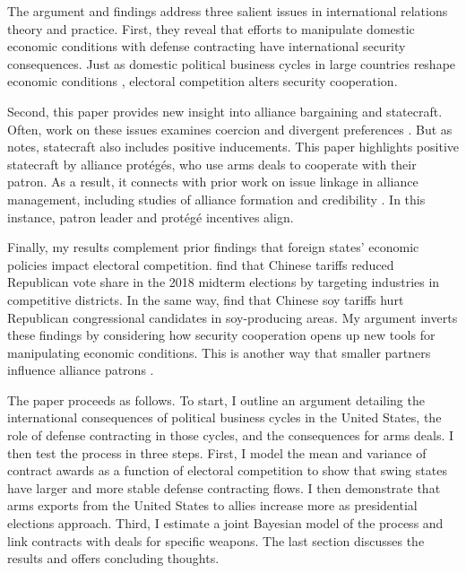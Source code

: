 \documentclass[12pt]{article}
\begin{document}
The argument and findings address three salient issues in international relations theory and practice. 
First, they reveal that efforts to manipulate domestic economic conditions with defense contracting have international security consequences. 
Just as domestic political business cycles in large countries reshape economic conditions \citep{Kayser2006, Kayser2009}, electoral competition alters security cooperation. 


Second, this paper provides new insight into alliance bargaining and statecraft. 
Often, work on these issues examines coercion and divergent preferences \citep{Oatley2015, WolfordKim2017, Blankenship2020, Beckeretal2023}. %
But as \citet{Baldwin2020} notes, statecraft also includes positive inducements. 
This paper highlights positive statecraft by alliance prot{\'e}g{\'e}s, who use arms deals to cooperate with their patron.
As a result, it connects with prior work on issue linkage in alliance management, including studies of alliance formation \citep{Poast2012} and credibility \citep{Davis2008, Poast2013}.
In this instance, patron leader and prot{\'e}g{\'e} incentives align.


Finally, my results complement prior findings that foreign states' economic policies impact electoral competition. 
\citet{KimMargalit2021} find that Chinese tariffs reduced Republican vote share in the 2018 midterm elections by targeting industries in competitive districts.
In the same way, \citet{ChyzhUrbatsch2021} find that Chinese soy tariffs hurt Republican congressional candidates in soy-producing areas. 
My argument inverts these findings by considering how security cooperation opens up new tools for manipulating economic conditions. 
This is another way that smaller partners influence alliance patrons \citep{Keohane1971}.


The paper proceeds as follows. 
To start, I outline an argument detailing the international consequences of political business cycles in the United States, the role of defense contracting in those cycles, and the consequences for arms deals. 
I then test the process in three steps. 
First, I model the mean and variance of contract awards as a function of electoral competition to show that swing states have larger and more stable defense contracting flows. 
I then demonstrate that arms exports from the United States to allies increase more as presidential elections approach.
Third, I estimate a joint Bayesian model of the process and link contracts with deals for specific weapons.
The last section discusses the results and offers concluding thoughts.
\end{document}
